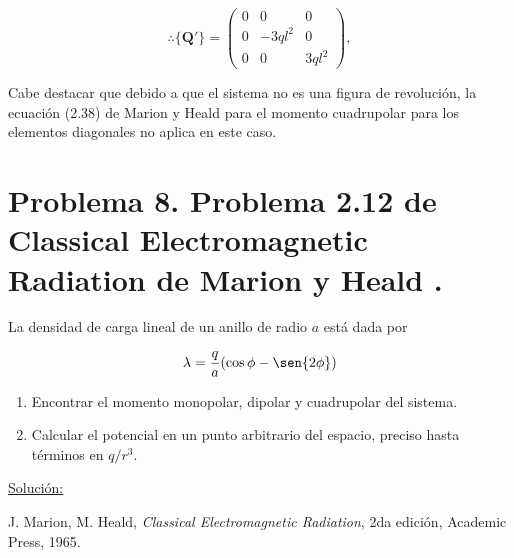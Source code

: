\documentclass[a4paper,11pt]{article}
\numberwithin{equation}{section}
\begin{document}
\begin{equation}
 \therefore \{ \mathbf{Q'} \} = \begin{pmatrix}
                     0 & 0 & 0 \\
                     0 & -3ql^2 & 0 \\
                     0 & 0 & 3ql^2
                    \end{pmatrix},
\end{equation}

Cabe destacar que debido a que el sistema no es una figura de revolución, 
la ecuación (2.38) de Marion y Heald \cite{marion2} para el momento 
cuadrupolar para los elementos diagonales no aplica en este caso.

\section{Problema 8. Problema 2.12 de Classical Electromagnetic Radiation
de Marion y Heald \cite{marion2}.}

La densidad de carga lineal de un anillo de radio $a$ está dada por 

$$
\lambda = \frac{q}{a}(\cos{\phi} - \sen{2\phi})
$$

\begin{enumerate}[label=\textbf{(\alph*)}]
\item Encontrar el momento monopolar, dipolar y cuadrupolar del sistema.
\item Calcular el potencial en un punto arbitrario del espacio, preciso hasta 
términos en $q/r^3$.
\end{enumerate}

\vspace{.3cm}

\underline{Solución:} \vspace{.3cm}

\begin{thebibliography}{10}
J. Marion, M. Heald, \emph{Classical Electromagnetic Radiation}, 2da edición, Academic 
Press, 1965.
\end{thebibliography}
\end{document}
